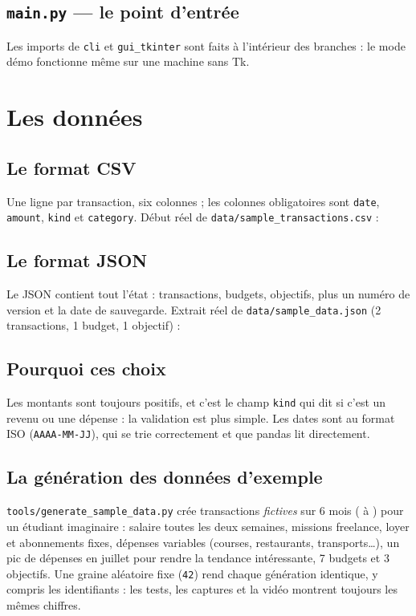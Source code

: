 \documentclass[11pt,a4paper]{article}
\newcommand{\code}[1]{{\NoAutoSpacing\texttt{#1}}}
\begin{document}
\subsection{\code{main.py} --- le point d'entrée}

Les imports de \code{cli} et \code{gui\_tkinter} sont faits à l'intérieur des branches : le mode
démo fonctionne même sur une machine sans Tk.

\section{Les données}

\subsection{Le format CSV}
Une ligne par transaction, six colonnes ; les colonnes obligatoires sont \code{date},
\code{amount}, \code{kind} et \code{category}. Début réel de
\code{data/sample\_transactions.csv} :


\subsection{Le format JSON}
Le JSON contient tout l'état : transactions, budgets, objectifs, plus un numéro de version et
la date de sauvegarde. Extrait réel de \code{data/sample\_data.json} (2 transactions, 1 budget,
1 objectif) :


\subsection{Pourquoi ces choix}
Les montants sont toujours positifs, et c'est le champ \code{kind} qui dit si c'est un revenu ou
une dépense : la validation est plus simple. Les dates sont au format ISO
(\code{AAAA-MM-JJ}), qui se trie correctement et que pandas lit directement.

\subsection{La génération des données d'exemple}
\code{tools/generate\_sample\_data.py} crée \SampleCount{} transactions \emph{fictives} sur
6 mois (\SampleFirstMonth{} à \SampleLastMonth) pour un étudiant imaginaire : salaire
toutes les deux semaines, missions freelance, loyer et abonnements fixes, dépenses variables
(courses, restaurants, transports\dots), un pic de dépenses en juillet pour rendre la tendance
intéressante, 7 budgets et 3 objectifs. Une graine aléatoire fixe (\code{42}) rend chaque
génération identique, y compris les identifiants : les tests, les captures et la vidéo
montrent toujours les mêmes chiffres.
\end{document}
